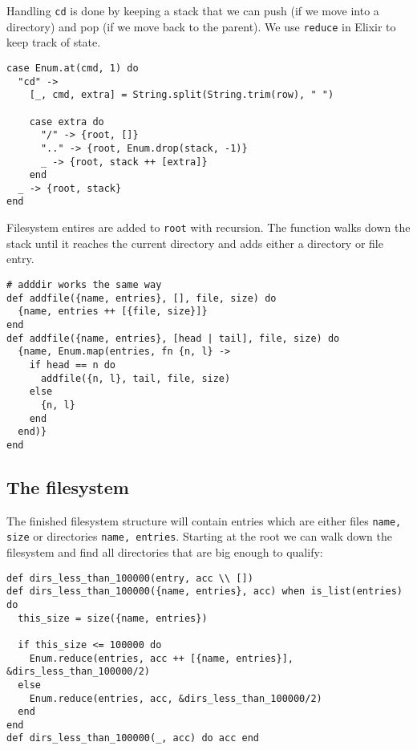 \documentclass[a4paper,11pt]{article}
\begin{document}
Handling \texttt{cd} is done by keeping a stack that we can push (if we move into a directory) and pop (if we move back to the parent).
We use \texttt{reduce} in Elixir to keep track of state.

\begin{verbatim}
case Enum.at(cmd, 1) do
  "cd" ->
    [_, cmd, extra] = String.split(String.trim(row), " ")

    case extra do
      "/" -> {root, []}
      ".." -> {root, Enum.drop(stack, -1)}
      _ -> {root, stack ++ [extra]}
    end
  _ -> {root, stack}
end
\end{verbatim}

Filesystem entires are added to \texttt{root} with recursion.
The function walks down the stack until it reaches the current directory and adds either a directory or file entry.

\begin{verbatim}
# adddir works the same way
def addfile({name, entries}, [], file, size) do
  {name, entries ++ [{file, size}]}
end
def addfile({name, entries}, [head | tail], file, size) do
  {name, Enum.map(entries, fn {n, l} ->
    if head == n do
      addfile({n, l}, tail, file, size)
    else
      {n, l}
    end
  end)}
end
\end{verbatim}

\subsection*{The filesystem}

The finished filesystem structure will contain entries which are either files \texttt{{name, size}} or directories \texttt{{name, entries}}.
Starting at the root we can walk down the filesystem and find all directories that are big enough to qualify:

\begin{verbatim}
def dirs_less_than_100000(entry, acc \\ [])
def dirs_less_than_100000({name, entries}, acc) when is_list(entries) do
  this_size = size({name, entries})

  if this_size <= 100000 do
    Enum.reduce(entries, acc ++ [{name, entries}], &dirs_less_than_100000/2)
  else
    Enum.reduce(entries, acc, &dirs_less_than_100000/2)
  end
end
def dirs_less_than_100000(_, acc) do acc end
\end{verbatim}
\end{document}
